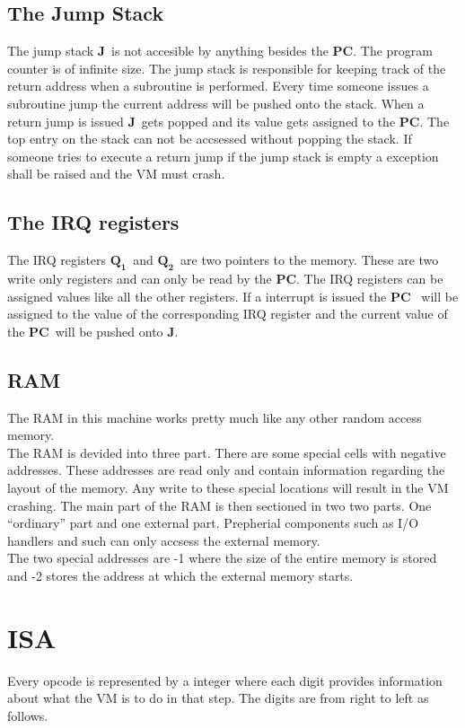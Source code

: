 \documentclass{article}
\newcommand{\q}{$\textbf{Q}_{\textbf{1}}$}
\newcommand{\qq}{$\textbf{Q}_{\textbf{2}}$}
\newcommand{\pc}{$\textbf{PC}$}
\newcommand{\J}{$\textbf{J}$}
\begin{document}
\subsection{The Jump Stack}
The jump stack \J \ is not accesible by anything besides the \pc. The program
counter is of infinite size. The jump stack is responsible for keeping track
of the return address when a subroutine is performed. Every time someone
issues a subroutine jump the current address will be pushed onto the stack.
When a return jump is issued \J \ gets popped and its value gets assigned to
the \pc. The top entry on the stack can not be accsessed without popping the
stack.
If someone tries to execute a return jump if the jump stack is empty a exception 
shall be raised and the VM must crash.

\subsection{The IRQ registers}
The IRQ registers \q \ and \qq \ are two pointers to the memory. These are two
write only registers and can only be read by the \pc. The IRQ registers can be
assigned values like all the other registers.  If a interrupt is issued the \pc
\ will be assigned to the value of the corresponding IRQ register and the current
value of the \pc \ will be pushed onto \J.

\subsection{RAM}
The RAM in this machine works pretty much like any other random access
memory.\\
The RAM is devided into three part. There are some special cells with negative
addresses. These addresses are read only and contain information regarding the
layout of the memory. Any write to these special locations will result in the
VM crashing. The main part of the RAM is then sectioned in two two parts. One
``ordinary'' part and one external part. Prepherial components such as I/O
handlers and such can only accsess the external memory.\\
The two special addresses are -1 where the size of the entire memory is stored
and -2 stores the address at which the external memory starts.

\section{ISA}
Every opcode is represented by a integer where each digit provides
information about what the VM is to do in that step. The digits are from right
to left as follows.
\end{document}
